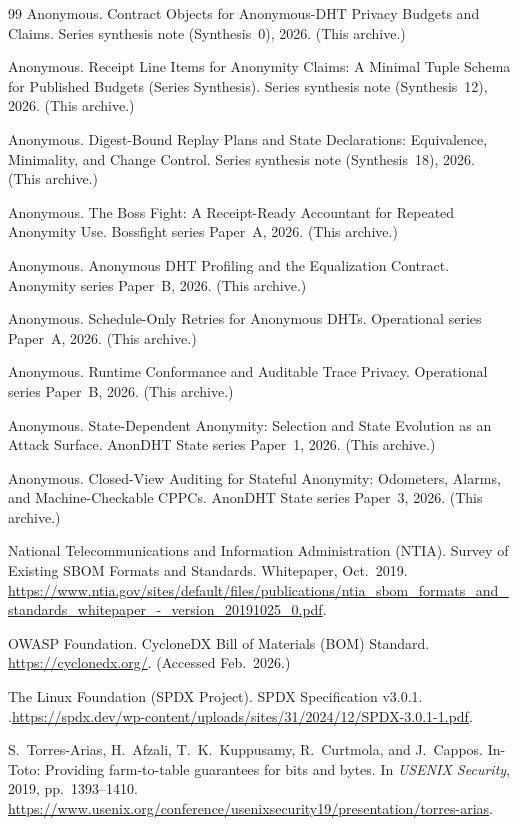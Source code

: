 \documentclass[11pt]{article}
\begin{document}
\begin{thebibliography}{99}
Anonymous.
\newblock Contract Objects for Anonymous-DHT Privacy Budgets and Claims.
\newblock Series synthesis note (Synthesis~0), 2026. (This archive.)

Anonymous.
\newblock Receipt Line Items for Anonymity Claims: A Minimal Tuple Schema for Published Budgets (Series Synthesis).
\newblock Series synthesis note (Synthesis~12), 2026. (This archive.)

Anonymous.
\newblock Digest-Bound Replay Plans and State Declarations: Equivalence, Minimality, and Change Control.
\newblock Series synthesis note (Synthesis~18), 2026. (This archive.)

Anonymous.
\newblock The Boss Fight: A Receipt-Ready Accountant for Repeated Anonymity Use.
\newblock Bossfight series Paper~A, 2026. (This archive.)

Anonymous.
\newblock Anonymous DHT Profiling and the Equalization Contract.
\newblock Anonymity series Paper~B, 2026. (This archive.)

Anonymous.
\newblock Schedule-Only Retries for Anonymous DHTs.
\newblock Operational series Paper~A, 2026. (This archive.)

Anonymous.
\newblock Runtime Conformance and Auditable Trace Privacy.
\newblock Operational series Paper~B, 2026. (This archive.)

Anonymous.
\newblock State-Dependent Anonymity: Selection and State Evolution as an Attack Surface.
\newblock AnonDHT State series Paper~1, 2026. (This archive.)

Anonymous.
\newblock Closed-View Auditing for Stateful Anonymity: Odometers, Alarms, and Machine-Checkable CPPCs.
\newblock AnonDHT State series Paper~3, 2026. (This archive.)

National Telecommunications and Information Administration (NTIA).
\newblock Survey of Existing SBOM Formats and Standards.
\newblock Whitepaper, Oct.~2019.\;
\newblock \url{https://www.ntia.gov/sites/default/files/publications/ntia_sbom_formats_and_standards_whitepaper_-_version_20191025_0.pdf}.

OWASP Foundation.
\newblock CycloneDX Bill of Materials (BOM) Standard.
\newblock \url{https://cyclonedx.org/}. (Accessed Feb.~2026.)

The Linux Foundation (SPDX Project).
\newblock SPDX Specification v3.0.1.
.\;\url{https://spdx.dev/wp-content/uploads/sites/31/2024/12/SPDX-3.0.1-1.pdf}.

S.~Torres-Arias, H.~Afzali, T.~K.~Kuppusamy, R.~Curtmola, and J.~Cappos.
\newblock In-Toto: Providing farm-to-table guarantees for bits and bytes.
\newblock In \emph{USENIX Security}, 2019, pp.~1393--1410.\;
\newblock \url{https://www.usenix.org/conference/usenixsecurity19/presentation/torres-arias}.
\end{thebibliography}
\end{document}
